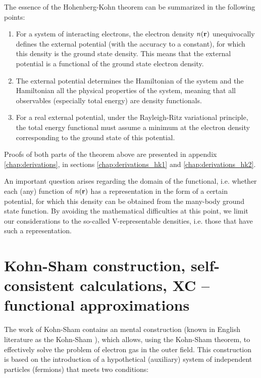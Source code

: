 The essence of the Hohenberg-Kohn theorem can be summarized in the following points:

\begin{enumerate}
\item For a system of interacting electrons, the electron density $n(\mathbf{r})$ unequivocally defines the external potential (with the accuracy to a constant), for which this density is the ground state density.
This means that the external potential is a functional of the ground state electron density.

\item The external potential determines the Hamiltonian of the system and the Hamiltonian all the physical properties of the system, meaning that all observables (especially total energy) are density functionals.

\item For a real external potential, under the Rayleigh-Ritz variational principle, the total energy functional must assume a minimum at the electron density corresponding to the ground state of this potential.
\end{enumerate}

Proofs of both parts of the theorem above are presented in appendix \ref{chap:derivations}, in sections \ref{chap:derivations_hk1} and \ref{chap:derivations_hk2}.

An important question arises regarding the domain of the functional, i.e. whether each (any) function of $n(\mathbf{r})$ has a representation in the form of a certain potential, for which this density can be obtained from the many-body ground state function.
By avoiding the mathematical difficulties at this point, we limit our considerations to the so-called V-representable densities, i.e. those that have such a representation.

\ornament

\section{Kohn-Sham construction, self-consistent calculations, XC -- functional approximations}

The work of Kohn-Sham \cite{kohn_sham_eq} contains an mental construction (known in English literature as the Kohn-Sham \ansatz), which allows, using the Kohn-Sham theorem, to effectively solve the problem of electron gas in the outer field.
This construction is based on the introduction of a hypothetical (auxiliary) system of independent particles (fermions) that meets two conditions:

